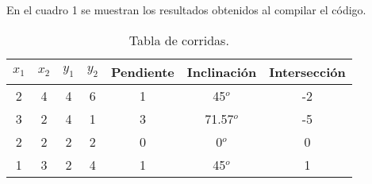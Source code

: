 En el cuadro 1 se muestran los resultados obtenidos al compilar el código.\\

\begin{table}[!ht]
\label{T:equipos}
\begin{center}
\begin{tabular}{| c | c | c | c | c | c | c |}
\hline
\textbf{$x_1$} & \textbf{$x_2$} & \textbf{$y_1$} & \textbf{$y_2$} & \textbf{Pendiente} & \textbf{Inclinación} & \textbf{Intersección} \\
\hline
2 & 4 & 4 & 6 & 1 & 45$^o$ & -2 \\
3 & 2 & 4 & 1 & 3 & 71.57$^o$ & -5 \\
2 & 2 & 2 & 2 & 0 & 0$^o$ & 0 \\
1 & 3 & 2 & 4 & 1 & 45$^o$ & 1 \\
\hline
\end{tabular}
\caption{Tabla de corridas.}
\end{center}
\end{table}